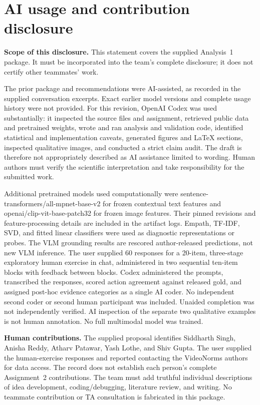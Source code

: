 \section*{AI usage and contribution disclosure}
\textbf{Scope of this disclosure.} This statement covers the supplied Analysis~1 package. It must be incorporated into the team's complete disclosure; it does not certify other teammates' work.

The prior package and recommendations were AI-assisted, as recorded in the supplied conversation excerpts. Exact earlier model versions and complete usage history were not provided. For this revision, OpenAI Codex was used substantially: it inspected the source files and assignment, retrieved public data and pretrained weights, wrote and ran analysis and validation code, identified statistical and implementation caveats, generated figures and LaTeX sections, inspected qualitative images, and conducted a strict claim audit. The draft is therefore not appropriately described as AI assistance limited to wording. Human authors must verify the scientific interpretation and take responsibility for the submitted work.

Additional pretrained models used computationally were sentence-transformers/all-mpnet-base-v2 for frozen contextual text features and openai/clip-vit-base-patch32 for frozen image features. Their pinned revisions and feature-processing details are included in the artifact logs. Empath, TF-IDF, SVD, and fitted linear classifiers were used as diagnostic representations or probes. The VLM grounding results are rescored author-released predictions, not new VLM inference. The user supplied 60 responses for a 20-item, three-stage exploratory human exercise in chat, administered in two sequential ten-item blocks with feedback between blocks. Codex administered the prompts, transcribed the responses, scored action agreement against released gold, and assigned post-hoc evidence categories as a single AI coder. No independent second coder or second human participant was included. Unaided completion was not independently verified. AI inspection of the separate two qualitative examples is not human annotation. No full multimodal model was trained.

\textbf{Human contributions.} The supplied proposal identifies Siddharth Singh, Anisha Reddy, Atharv Patawar, Yash Lothe, and Shiv Gupta. The user supplied the human-exercise responses and reported contacting the VideoNorms authors for data access. The record does not establish each person's complete Assignment~2 contributions. The team must add truthful individual descriptions of idea development, coding/debugging, literature review, and writing. No teammate contribution or TA consultation is fabricated in this package.
